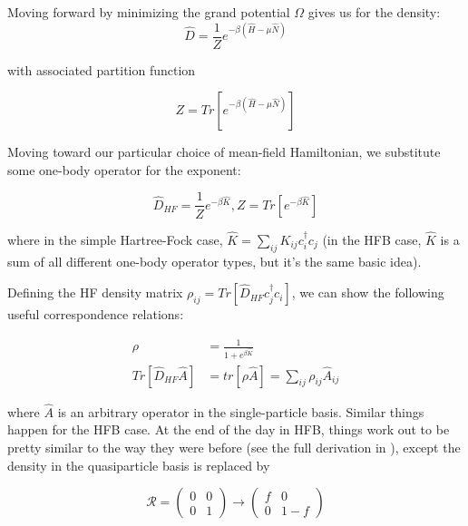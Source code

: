 Moving forward by minimizing the grand potential $\Omega$ gives us for the density:
\begin{equation}
\hat{D} = \frac{1}{Z}e^{-\beta\left(\hat{H}-\mu\hat{N}\right)}
\end{equation}

\noindent with associated partition function

\begin{equation}
Z = Tr\left[e^{-\beta\left(\hat{H}-\mu\hat{N}\right)}\right]
\end{equation}

Moving toward our particular choice of mean-field Hamiltonian, we substitute some one-body operator for the exponent:

\begin{equation}
\hat{D}_{HF} = \frac{1}{Z}e^{-\beta\hat{K}}, Z = Tr\left[e^{-\beta\hat{K}}\right]
\end{equation}

\noindent where in the simple Hartree-Fock case, $\hat{K} = \sum_{ij}K_{ij}c_i^\dagger c_j$ (in the HFB case, $\hat{K}$ is a sum of all different one-body operator types, but it's the same basic idea).

Defining the HF density matrix $\rho_{ij}=Tr\left[\hat{D}_{HF}c_j^\dagger c_i\right]$, we can show the following useful correspondence relations:

\begin{align}
\rho &= \frac{1}{1+e^{\beta\hat{K}}} \\
Tr\left[\hat{D}_{HF}\hat{A}\right] &= tr\left[\rho\hat{A}\right] = \sum_{ij}\rho_{ij}\hat{A}_{ij}
\end{align}

\noindent where $\hat{A}$ is an arbitrary operator in the single-particle basis. Similar things happen for the HFB case. At the end of the day in HFB, things work out to be pretty similar to the way they were before (see the full derivation in \cite{Goodman1981}), except the density in the quasiparticle basis is replaced by

\begin{equation}
\mathcal{R} =
\left(\begin{array}{cc}
0 & 0 \\
0 & 1
\end{array}\right)
\rightarrow
\left(\begin{array}{cc}
f & 0 \\
0 & 1-f
\end{array}\right)
\end{equation}


